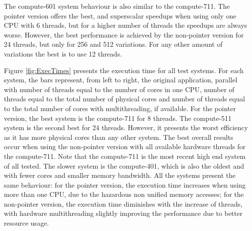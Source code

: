 The compute-601 system behaviour is also similar to the compute-711. The pointer version offers the best, and superscalar speedups when using only one CPU with 6 threads, but for a higher number of threads the speedups are always worse. However, the best performance is achieved by the non-pointer version for 24 threads, but only for 256 and 512 variations. For any other amount of variations the best is to use 12 threads.

Figure \ref{fig:ExecTimes} presents the execution time for all test systems. For each system, the bars represent, from left to right, the original application, parallel with number of threads equal to the number of cores in one CPU, number of threads equal to the total number of physical cores and number of threads equal to the total number of cores with multithreading, if available. For the pointer version, the best system is the compute-711 for 8 threads. The compute-511 system is the second best for 24 threads. However, it presents the worst efficiency as it has more physical cores than any other system. The best overall results occur when using the non-pointer version with all available hardware threads for the compute-711. Note that the compute-711 is the most recent high end system of all tested. The slower system is the compute-401, which is also the oldest and with fewer cores and smaller memory bandwidth. All the systems present the same behaviour: for the pointer version, the execution time increases when using more than one CPU, due to the hazardous non unified memory accesses; for the non-pointer version, the execution time diminishes with the increase of threads, with hardware multithreading slightly improving the performance due to better resource usage.

